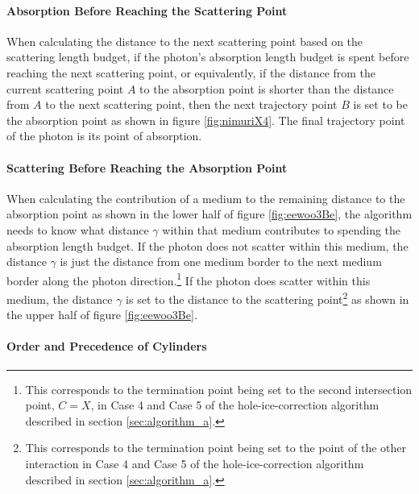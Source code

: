 \paragraph{Absorption Before Reaching the Scattering Point}

When calculating the distance to the next scattering point based on the
scattering length budget, if the photon's absorption length budget is
spent before reaching the next scattering point, or equivalently, if the
distance from the current scattering point \(A\) to the absorption point
is shorter than the distance from \(A\) to the next scattering point,
then the next trajectory point \(B\) is set to be the absorption point
as shown in figure \ref{fig:nimuriX4}. The final trajectory point of the
photon is its point of absorption.

\paragraph{Scattering Before Reaching the Absorption Point}

When calculating the contribution of a medium to the remaining distance
to the absorption point as shown in the lower half of figure
\ref{fig:eewoo3Be}, the algorithm needs to know what distance \(\gamma\)
within that medium contributes to spending the absorption length budget.
If the photon does not scatter within this medium, the distance
\(\gamma\) is just the distance from one medium border to the next
medium border along the photon
direction.\footnote{This corresponds to the termination point being set to the second intersection point, $C = X$, in Case 4 and Case 5 of the hole-ice-correction algorithm described in section \ref{sec:algorithm_a}.}
If the photon does scatter within this medium, the distance \(\gamma\)
is set to the distance to the scattering
point\footnote{This corresponds to the termination point being set to the point of the other interaction in Case 4 and Case 5 of the hole-ice-correction algorithm described in section \ref{sec:algorithm_a}.}
as shown in the upper half of figure \ref{fig:eewoo3Be}.

\paragraph{Order and Precedence of Cylinders}

